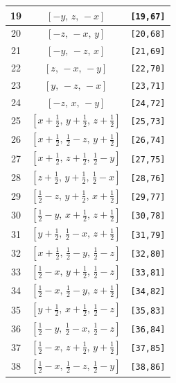 \documentclass[fleqn,8pt]{jsarticle}
\begin{document}
\begin{longtable}{ccc}
19 & $\left[ - y,\, z,\, - x \right]$ & {\tt [19,67]} \\ \hline
20 & $\left[ - z,\, - x,\, y \right]$ & {\tt [20,68]} \\ \hline
21 & $\left[ - y,\, - z,\, x \right]$ & {\tt [21,69]} \\ \hline
22 & $\left[ z,\, - x,\, - y \right]$ & {\tt [22,70]} \\ \hline
23 & $\left[ y,\, - z,\, - x \right]$ & {\tt [23,71]} \\ \hline
24 & $\left[ - z,\, x,\, - y \right]$ & {\tt [24,72]} \\ \hline
25 & $\left[ x + \frac{1}{2},\, y + \frac{1}{2},\, z + \frac{1}{2} \right]$ & {\tt [25,73]} \\ \hline
26 & $\left[ x + \frac{1}{2},\, \frac{1}{2} - z,\, y + \frac{1}{2} \right]$ & {\tt [26,74]} \\ \hline
27 & $\left[ x + \frac{1}{2},\, z + \frac{1}{2},\, \frac{1}{2} - y \right]$ & {\tt [27,75]} \\ \hline
28 & $\left[ z + \frac{1}{2},\, y + \frac{1}{2},\, \frac{1}{2} - x \right]$ & {\tt [28,76]} \\ \hline
29 & $\left[ \frac{1}{2} - z,\, y + \frac{1}{2},\, x + \frac{1}{2} \right]$ & {\tt [29,77]} \\ \hline
30 & $\left[ \frac{1}{2} - y,\, x + \frac{1}{2},\, z + \frac{1}{2} \right]$ & {\tt [30,78]} \\ \hline
31 & $\left[ y + \frac{1}{2},\, \frac{1}{2} - x,\, z + \frac{1}{2} \right]$ & {\tt [31,79]} \\ \hline
32 & $\left[ x + \frac{1}{2},\, \frac{1}{2} - y,\, \frac{1}{2} - z \right]$ & {\tt [32,80]} \\ \hline
33 & $\left[ \frac{1}{2} - x,\, y + \frac{1}{2},\, \frac{1}{2} - z \right]$ & {\tt [33,81]} \\ \hline
34 & $\left[ \frac{1}{2} - x,\, \frac{1}{2} - y,\, z + \frac{1}{2} \right]$ & {\tt [34,82]} \\ \hline
35 & $\left[ y + \frac{1}{2},\, x + \frac{1}{2},\, \frac{1}{2} - z \right]$ & {\tt [35,83]} \\ \hline
36 & $\left[ \frac{1}{2} - y,\, \frac{1}{2} - x,\, \frac{1}{2} - z \right]$ & {\tt [36,84]} \\ \hline
37 & $\left[ \frac{1}{2} - x,\, z + \frac{1}{2},\, y + \frac{1}{2} \right]$ & {\tt [37,85]} \\ \hline
38 & $\left[ \frac{1}{2} - x,\, \frac{1}{2} - z,\, \frac{1}{2} - y \right]$ & {\tt [38,86]} \\ \hline

\end{longtable}
\end{document}
